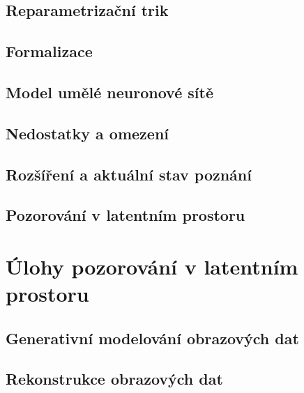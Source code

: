 \documentclass[11pt,a4paper]{report}
\begin{document}
\section{Reparametrizační trik}

\cite{Goodfellow2016}
\section{Formalizace}
\section{Model umělé neuronové sítě}
\section{Nedostatky a omezení}
\section{Rozšíření a aktuální stav poznání}
\section{Pozorování v latentním prostoru}


\chapter{Úlohy pozorování v latentním prostoru}
\label{chap:applications}
\section{Generativní modelování obrazových dat}
\section{Rekonstrukce obrazových dat}
\end{document}
